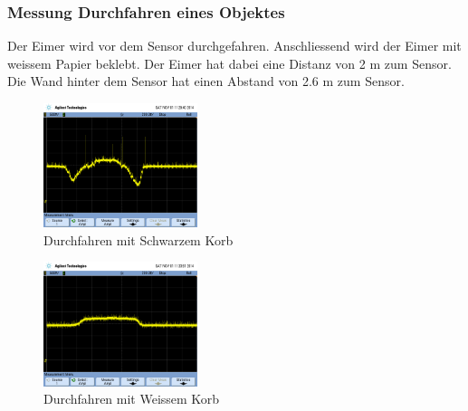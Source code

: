\subsubsection{Messung Durchfahren eines Objektes}
Der Eimer wird vor dem Sensor durchgefahren. Anschliessend wird der Eimer mit 
weissem Papier beklebt. Der Eimer hat dabei eine Distanz von 2 m zum Sensor. 
Die Wand hinter dem Sensor hat einen Abstand von 2.6 m zum Sensor. 
\begin{figure}[h!]
    \centering
    \includegraphics[width=0.4\textwidth]{fig/scope_75.png}
    \caption{Durchfahren mit Schwarzem Korb}
    \label{fig:shift_ir_black}
\end{figure}
\begin{figure}[h!]
    \centering
    \includegraphics[width=0.4\textwidth]{fig/scope_77.png}
    \caption{Durchfahren mit Weissem Korb}
    \label{fig:shift_ir_white}
\end{figure}

